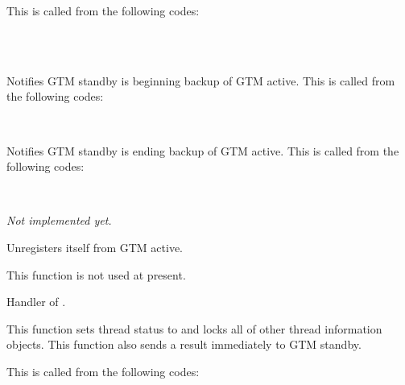     This is called from the following codes:
    
    \FuncRefHdr
		\\
		\\ \hline
    \FuncRefTrailor
  
  
    Notifies GTM standby is beginning backup of GTM active.
    This is called from the following codes:
    
    \FuncRefHdr
		\\ \hline
    \FuncRefTrailor
  
  
    Notifies GTM standby is ending backup of GTM active.
    This is called from the following codes:
    
    \FuncRefHdr
		\\ \hline
    \FuncRefTrailor
  
  
    \textit{Not implemented yet.}
  
  
    Unregisters itself from GTM active.
    
    This function is not used at present.
  
  
    Handler of .
    
    This function sets thread status to  and locks all of other thread information objects.
    This function also sends a result immediately to GTM standby.
    
    This is called from the following codes:
    
    \FuncRefHdr
		\\ \hline
    \FuncRefTrailor
  
